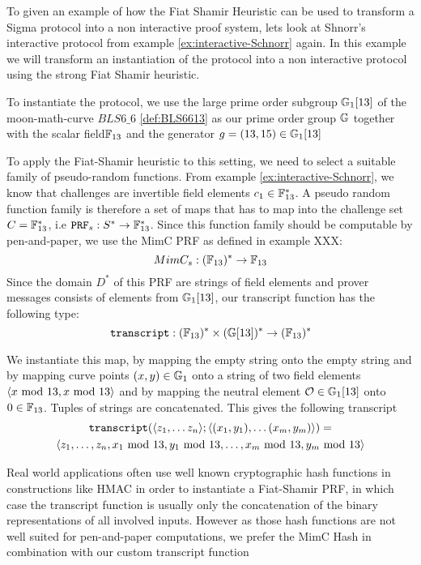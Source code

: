 \begin{example}
\label{ex:Schnorr-SNARK}
To given an example of how the Fiat Shamir Heuristic can be used to transform a Sigma protocol into a non interactive proof system, lets look at Shnorr's interactive protocol from example  \ref{ex:interactive-Schnorr} again. In this example we will transform an instantiation of the protocol into a non interactive protocol using the strong Fiat Shamir heuristic.  

To instantiate the protocol, we use the large prime order subgroup $\mathbb{G}_1[13]$ of the moon-math-curve $BLS6\_6$ \ref{def:BLS6613} as our prime order group $\mathbb{G}$ together with the scalar field$\mathbb{F}_{13}$ and the generator $g=(13,15)\in \mathbb{G}_1[13]$

To apply the Fiat-Shamir heuristic to this setting, we need to select a suitable family of pseudo-random functions. From example \ref{ex:interactive-Schnorr}, we know that challenges are invertible field elements $c_1\in \mathbb{F}_{13}^*$. A pseudo random function family is therefore a set of maps that has to map into the challenge set $C= \mathbb{F}_{13}^*$, i.e $\mathtt{PRF}_s : S^* \to \mathbb{F}_{13}^*$. Since this function family should be computable by pen-and-paper, we use the MimC PRF as defined in example XXX:
$$
MimC_s : (\mathbb{F}_{13})^* \to \mathbb{F}_{13}
$$
Since the domain $D^*$ of this PRF are strings of field elements and prover messages consists of elements from $\mathbb{G}_1[13]$, our transcript function has the following type:
$$
\mathtt{transcript}: (\mathbb{F}_{13})^* \times (\mathbb{G}[13])^* \to (\mathbb{F}_{13})^*
$$
 
We instantiate this map, by mapping the empty string onto the empty string and by mapping curve points $(x,y)\in \mathbb{G}_1$ onto a string of two field elements $\langle x \text{ mod } 13,x \text{ mod } 13\rangle$ and by mapping the neutral element $\mathcal{O}\in \mathbb{G}_1[13]$ onto $0\in \mathbb{F}_{13}$. Tuples of strings are concatenated. This gives the following transcript
\begin{multline*}
\mathtt{transcript}(\langle z_1,\ldots z_n\rangle; \langle(x_1,y_1),\ldots (x_m,y_m)\rangle)= \\
\langle z_1,\ldots, z_n, x_1 \text{ mod } 13, y_1 \text{ mod } 13,\ldots, x_m \text{ mod } 13,y_m \text{ mod } 13 \rangle   
\end{multline*}

Real world applications often use well known cryptographic hash functions in constructions like HMAC in order to instantiate a Fiat-Shamir PRF, in which case the transcript function is usually only the concatenation of the binary representations of all involved inputs. However as those hash functions are not well suited for pen-and-paper computations, we prefer the MimC Hash in combination with our custom transcript function


\end{example}
